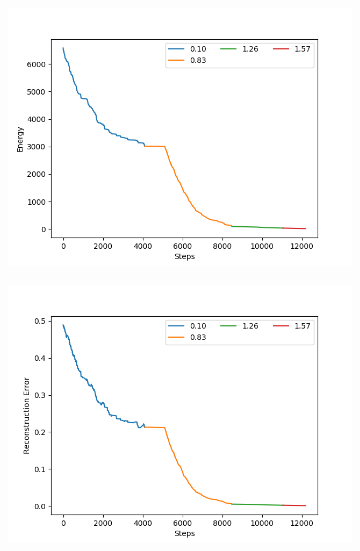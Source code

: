 \documentclass{scrartcl}
\begin{document}
\begin{figure}[h]
    \centering
    \begin{subfigure}{0.49\textwidth}
        \includegraphics[width=\textwidth]{plot_energy_1000_10000.png}
    \end{subfigure}
    \begin{subfigure}{0.49\textwidth}
        \includegraphics[width=\textwidth]{plot_error_1000_10000.png}
    \end{subfigure}
        \begin{subfigure}{0.49\textwidth}

\end{subfigure}
\end{figure}
\end{document}
